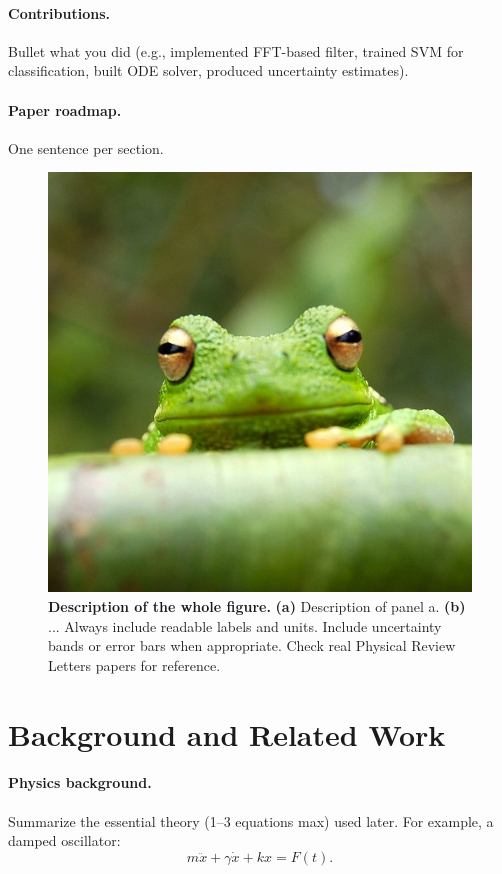 \documentclass[reprint, superscriptaddress, aps]{revtex4-2}
\begin{document}
\paragraph*{Contributions.} Bullet what you did (e.g., implemented FFT-based filter, trained SVM for classification, built ODE solver, produced uncertainty estimates).

\paragraph*{Paper roadmap.} One sentence per section.

\begin{figure}
  \centering
  \includegraphics[width=\linewidth]{frog.jpg}
  \caption{\textbf{Description of the whole figure.} \textbf{(a)} Description of panel a. \textbf{(b)} ... Always include readable labels and units. Include uncertainty bands or error bars when appropriate. Check real Physical Review Letters papers for reference.}
  \label{fig:intro}
\end{figure}


\section{Background and Related Work}

\paragraph*{Physics background.} Summarize the essential theory (1--3 equations max) used later. For example, a damped oscillator:
\begin{equation}
m \ddot{x} + \gamma \dot{x} + k x = F(t).
\end{equation}
\end{document}
